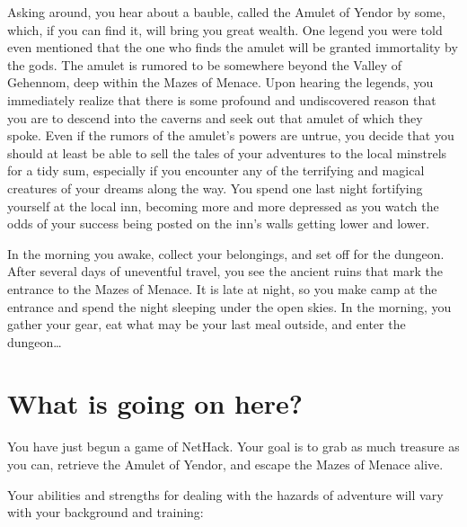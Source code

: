 \documentclass[11pt]{article}
\begin{document}
Asking around, you hear about a bauble, called the Amulet of Yendor by
some, which, if you can find it, will bring you great wealth.  One
legend you were told even mentioned that the one who finds the amulet
will be granted immortality by the gods.  The amulet is rumored to be
somewhere beyond the Valley of Gehennom, deep within the Mazes of
Menace.  Upon hearing the legends, you immediately realize that there
is some profound and undiscovered reason that you are to descend into
the caverns and seek out that amulet of which they spoke.  Even if the
rumors of the amulet's powers are untrue, you decide that you should
at least be able to sell the tales of your adventures to the local
minstrels for a tidy sum, especially if you encounter any of the
terrifying and magical creatures of your dreams along the way.  You
spend one last night fortifying yourself at the local inn, becoming
more and more depressed as you watch the odds of your success being
posted on the inn's walls getting lower and lower.

In the morning you awake, collect your belongings, and set off for the
dungeon.  After several days of uneventful travel, you see the ancient
ruins that mark the entrance to the Mazes of Menace.  It is late at
night, so you make camp at the entrance and spend the night sleeping
under the open skies.  In the morning, you gather your gear, eat what
may be your last meal outside, and enter the dungeon\ldots{}


\section{What is going on here?}
\label{sec:org3d08c65}


You have just begun a game of NetHack.  Your goal is to grab as much
treasure as you can, retrieve the Amulet of Yendor, and escape the
Mazes of Menace alive.

Your abilities and strengths for dealing with the hazards of adventure
will vary with your background and training:
\end{document}

